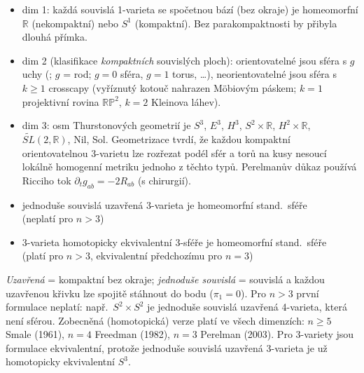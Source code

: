 \begin{vysvetleni}
\begin{itemize}[nosep]
  \item dim 1: každá souvislá 1-varieta se spočetnou bází (bez okraje) je homeomorfní $\mathbb{R}$ (nekompaktní) nebo $S^1$ (kompaktní). Bez parakompaktnosti by přibyla dlouhá přímka.
  \item dim 2 (klasifikace \emph{kompaktních} souvislých ploch): orientovatelné jsou sféra s $g$ uchy (; $g$ = rod; $g=0$ sféra, $g=1$ torus, \dots), neorientovatelné jsou sféra s $k\geq1$ crosscapy (vyříznutý kotouč nahrazen Möbiovým páskem; $k=1$ projektivní rovina $\mathbb{RP}^2$, $k=2$ Kleinova láhev).
  \item dim 3: osm Thurstonových geometrií je $S^3$, $E^3$, $H^3$, $S^2\times\mathbb{R}$, $H^2\times\mathbb{R}$, $\widetilde{SL}(2,\mathbb{R})$, Nil, Sol. Geometrizace tvrdí, že každou kompaktní orientovatelnou 3-varietu lze rozřezat podél sfér a torů na kusy nesoucí lokálně homogenní metriku jednoho z těchto typů. Perelmanův důkaz používá Ricciho tok $\partial_t g_{ab}=-2R_{ab}$ (s chirurgií).
\end{itemize}
\end{vysvetleni}

\begin{veta}
\begin{itemize}[nosep]
  \item jednoduše souvislá uzavřená 3-varieta je homeomorfní stand.\ sféře \\
        (neplatí pro $n > 3$)
  \item 3-varieta homotopicky ekvivalentní 3-sféře je homeomorfní stand.\ sféře \\
        (platí pro $n > 3$, ekvivalentní předchozímu pro $n = 3$)
\end{itemize}
\end{veta}

\begin{vysvetleni}
\emph{Uzavřená} = kompaktní bez okraje; \emph{jednoduše souvislá} = souvislá a každou uzavřenou křivku lze spojitě stáhnout do bodu ($\pi_1=0$). Pro $n>3$ první formulace neplatí: např.\ $S^2\times S^2$ je jednoduše souvislá uzavřená 4-varieta, která není sférou. Zobecněná (homotopická) verze platí ve všech dimenzích: $n\geq5$ Smale (1961), $n=4$ Freedman (1982), $n=3$ Perelman (2003). Pro 3-variety jsou formulace ekvivalentní, protože jednoduše souvislá uzavřená 3-varieta je už homotopicky ekvivalentní $S^3$.
\end{vysvetleni}

